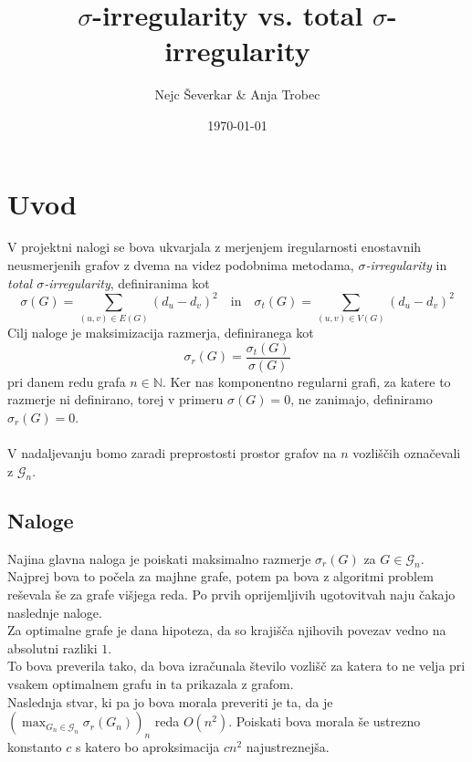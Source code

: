 \documentclass[ letterpaper, titlepage, fleqn]{article}
\begin{document}
\title{$\sigma$-irregularity vs. total $\sigma$-irregularity}
\author{Nejc Ševerkar \& Anja Trobec}
\date{\today}
\maketitle
\pagebreak

\thispagestyle{empty}
\tableofcontents
\pagebreak

\section{Uvod}

V projektni nalogi se bova ukvarjala z merjenjem iregularnosti enostavnih neusmerjenih grafov z
dvema na videz podobnima metodama, {\em $\sigma$-irregularity} in {\em total $\sigma$-irregularity},
definiranima kot 
$$
\sigma(G) = \sum_{(u, v) \in E(G)}(d_u - d_v)^2 
\quad \text{in} \quad
\sigma_t(G) = \sum_{(u, v) \in V(G)}(d_u - d_v)^2
$$
Cilj naloge je maksimizacija razmerja, definiranega kot 
$$\sigma_r(G) = \frac{\sigma_t(G)}{\sigma(G)}$$
pri danem redu grafa $n \in \mathbb{N}$.
Ker nas komponentno regularni grafi, za katere to razmerje ni definirano,
torej v primeru $\sigma(G) = 0$, ne zanimajo, definiramo $\sigma_r(G) = 0$.
\\\\
V nadaljevanju bomo zaradi preprostosti prostor grafov na $n$ vozliščih označevali z $\mathscr{G}_n$.

\subsection{Naloge}

Najina glavna naloga je poiskati maksimalno razmerje $\sigma_r(G)$ za $G \in \mathscr{G}_n$.
Najprej bova to počela za majhne grafe, potem pa bova z algoritmi problem reševala še za grafe višjega reda. 
Po prvih oprijemljivih ugotovitvah naju čakajo naslednje naloge. \\

Za optimalne grafe je dana hipoteza, da so krajišča njihovih povezav vedno na absolutni razliki $1$. \\
To bova preverila tako, da bova izračunala število vozlišč za katera
to ne velja pri vsakem optimalnem grafu in ta prikazala z grafom. \\

Naslednja stvar, ki pa jo bova morala preveriti je ta, da je $(\max_{G_n \in \mathscr{G}_n} \sigma_r(G_n))_n$ 
reda $O(n^2)$. 
Poiskati bova morala še ustrezno konstanto $c$ s katero bo aproksimacija $cn^2$ najustreznejša.
\end{document}
